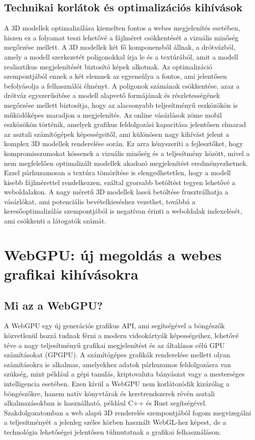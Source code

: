 \documentclass[12pt]{report}
\begin{document}
        \subsection{Technikai korlátok és optimalizációs kihívások}

        A 3D modellek optimalizálása kiemelten fontos a webes megjelenítés esetében, hiszen ez a folyamat teszi lehetővé a fájlméret csökkentését a vizuális minőség megőrzése mellett. A 3D modellek két fő komponensből állnak, a drótvázból, amely a modell szerkezetét poligonokkal írja le és a textúrából, amit a modell realisztikus megjelenítését biztosító képek alkotnak. Az optimalizáció szempontjából ennek a két elemnek az egyensúlya a fontos, ami jelentősen befolyásolja a felhasználói élményt. A poligonok számának csökkentése, azaz a drótváz egyszerűsítése a modell alapvető formájának és részletességének megőrzése mellett biztosítja, hogy az alacsonyabb teljesítményű eszközökön is működőképes maradjon a megjelenítés. Az online vásárlások zöme mobil eszközökön történik, amelyek grafikus feldolgozási kapacitása jelentősen elmarad az asztali számítógépek képességeitől, ami különösen nagy kihívást jelent a komplex 3D modellek renderelése során. Ez arra kényszeríti a fejlesztőket, hogy kompromisszumokat kössenek a vizuális minőség és a teljesítmény között, mivel a nem megfelelően optimalizált modellek akadozó megjelenítést eredményezhetnek. Ezzel párhuzamosan a textúra tömörítése is elengedhetetlen, hogy a modell kisebb fájlmérettel rendelkezzen, ezáltal gyorsabb betöltést tegyen lehetővé a weboldalakon. A nagy méretű 3D modellek lassú betöltése frusztrálhatja a vásárlókat, ami potenciális bevételkieséshez vezethet, továbbá a keresőoptimalizálás szempontjából is negatívan érinti a weboldalak indexelését, ami csökkenti a látogatók számát.

        
        \section{WebGPU: új megoldás a webes grafikai kihívásokra}
        \subsection{Mi az a WebGPU?}

        A WebGPU egy új generációs grafikus API, ami segítségével a böngészők közvetlenül hozzá tudnak férni a modern videokártyák képességeihez, lehetővé téve a nagy teljesítményű grafikai megjelenítést és az általános célú GPU számításokat (GPGPU). A számítógépes grafikák renderelése mellett olyan számításokra is alkalmas, amelyekhez adatok párhuzamos feldolgozásra van szükség, mint például a gépi tanulás, kriptovaluta bányászat vagy a mesterséges intelligencia esetében. Ezen kívül a WebGPU nem korlátozódik kizárólag a böngészőkre, hanem natív könyvtárak és keretrendszerek révén asztali alkalmazásokban is használható, például C++ és Rust segítségével. Szakdolgozatomban a web alapú 3D renderelés szempontjából fogom megvizsgálni a teljesítményét a jelenleg széles körben használt WebGL-hez képest, de a technológia lehetőségei jelentősen túlmutatnak a grafikai felhasználáson.
        
\end{document}
